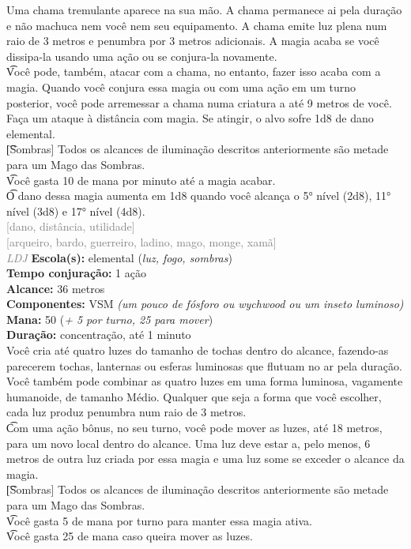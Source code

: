 \documentclass{RPG_Adventure}[2021/10/20]
\begin{document}
{\normalsize Uma chama tremulante aparece na sua mão. A chama permanece ai pela duração e não machuca nem você nem seu equipamento. A chama emite luz plena num raio de 3 metros e penumbra por 3 metros adicionais. A magia acaba se você dissipa-la usando uma ação ou se conjura-la novamente.\\\t Você pode, também, atacar com a chama, no entanto, fazer isso acaba com a magia. Quando você conjura essa magia ou com uma ação em um turno posterior, você pode arremessar a chama numa criatura a até 9 metros de você. Faça um ataque à distância com magia. Se atingir, o alvo sofre 1d8 de dano elemental.\\\t [Sombras] Todos os alcances de iluminação descritos anteriormente são metade para um Mago das Sombras.\\\t Você gasta 10 de mana por minuto até a magia acabar.\\\t O dano dessa magia aumenta em 1d8 quando você alcança o 5° nível (2d8), 11° nível (3d8) e 17° nível (4d8).\\}
{\scriptsize \textcolor{gray}{[dano, distância, utilidade]\\}}
{\scriptsize \textcolor{gray}{[arqueiro, bardo, guerreiro, ladino, mago, monge, xamã]\\}}
{\tiny \textcolor{gray}{\textit{LDJ}}}\jump{}
{\small \t \textbf{Escola(s):} elemental (\textit{luz, fogo, sombras})\\\t \textbf{Tempo conjuração:} 1 ação\\\t \textbf{Alcance:} 36 metros\\\t \textbf{Componentes:} VSM \textit{(um pouco de fósforo ou wychwood ou um inseto luminoso)}\\\t \textbf{Mana:} 50 (\textit{+ 5 por turno, 25 para mover})\\\t \textbf{Duração:} concentração, até 1 minuto\\}
{\normalsize Você cria até quatro luzes do tamanho de tochas dentro do alcance, fazendo-as parecerem tochas, lanternas ou esferas luminosas que flutuam no ar pela duração. Você também pode combinar as quatro luzes em uma forma luminosa, vagamente humanoide, de tamanho Médio. Qualquer que seja a forma que você escolher, cada luz produz penumbra num raio de 3 metros.\\\t Com uma ação bônus, no seu turno, você pode mover as luzes, até 18 metros, para um novo local dentro do alcance. Uma luz deve estar a, pelo menos, 6 metros de outra luz criada por essa magia e uma luz some se exceder o alcance da magia.\\\t [Sombras] Todos os alcances de iluminação descritos anteriormente são metade para um Mago das Sombras.\\\t Você gasta 5 de mana por turno para manter essa magia ativa.\\\t Você gasta 25 de mana caso queira mover as luzes.\\}
\end{document}
